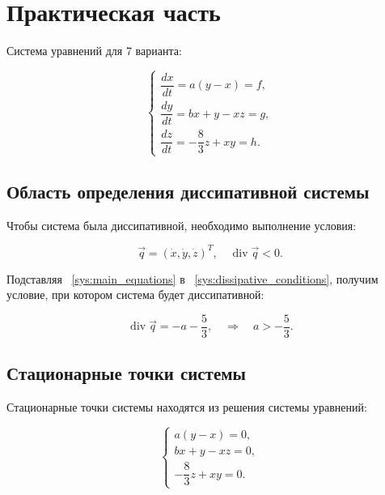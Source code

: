 \documentclass[14pt,a4paper]{extarticle}
\theoremstyle{plain}
\begin{document}
	\newpage
	
	\section{Практическая часть}
	
	Система уравнений для 7 варианта:
	
	\begin{equation}
		\begin{cases}
			\dfrac{dx}{dt} = a(y-x) = f, \\[12pt]
			\dfrac{dy}{dt} = bx + y - xz = g, \\[12pt]
			\dfrac{dz}{dt} = -\dfrac{8}{3}z + xy = h.
		\end{cases}
			\label{sys:main_equations}
	\end{equation}
	
	\subsection{Область определения диссипативной системы}
	
	Чтобы система была диссипативной, необходимо выполнение условия:
	
	\begin{equation}
		\vec{q} = (\dot{x}, \dot{y}, \dot{z})^T, \quad \operatorname{div} \vec{q} < 0.
		\label{sys:dissipative_conditions}
	\end{equation}
	
	Подставляя ~\eqref{sys:main_equations} в ~\eqref{sys:dissipative_conditions}, получим условие, при котором система будет диссипативной:
	
	\begin{equation}
		\operatorname{div} \vec{q} = -a - \frac{5}{3}, \quad \Rightarrow \quad a > -\frac{5}{3}.
		\label{sys:dissipative_system}
		\nonumber
	\end{equation}
	
	\subsection{Стационарные точки системы}
	
	Стационарные точки системы находятся из решения системы уравнений:
	
	\begin{equation}
		\begin{cases}
			a(y-x) = 0, \\[12pt]
			bx + y - xz = 0, \\[12pt]
			-\dfrac{8}{3}z + xy = 0.
		\end{cases} \nonumber
	\end{equation}
	
\end{document}

